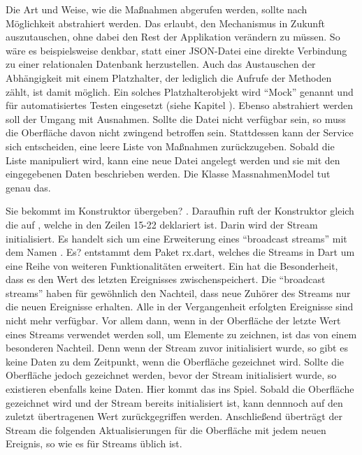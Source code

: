 Die Art und Weise, wie die Maßnahmen abgerufen werden, sollte nach Möglichkeit abstrahiert werden.
Das erlaubt, den Mechanismus in Zukunft auszutauschen, ohne dabei den Rest der Applikation verändern zu müssen.
So wäre es beispielsweise denkbar, statt einer JSON-Datei eine direkte Verbindung zu einer relationalen Datenbank herzustellen.
Auch das Austauschen der Abhängigkeit mit einem Platzhalter, der lediglich die Aufrufe der Methoden zählt, ist damit möglich.
Ein solches Platzhalterobjekt wird \enquote{Mock} genannt und für automatisiertes Testen eingesetzt (siehe Kapitel  ).
Ebenso abstrahiert werden soll der Umgang mit Ausnahmen.
Sollte die Datei nicht verfügbar sein, so muss die Oberfläche davon nicht zwingend betroffen sein.
Stattdessen kann der Service sich entscheiden, eine leere Liste von Maßnahmen zurückzugeben.
Sobald die Liste manipuliert wird, kann eine neue Datei angelegt werden und sie mit den eingegebenen Daten beschrieben werden.
Die Klasse MassnahmenModel \Lst{\ref{lst:Schritt1KlasseMassnahmenModel}} tut genau das.






Sie bekommt  im Konstruktor übergeben? .
Daraufhin ruft der Konstruktor gleich die  auf , welche in den Zeilen 15-22 deklariert ist.
Darin wird der Stream   initialisiert.
Es handelt sich um eine Erweiterung eines \enquote{broadcast streams} mit dem Namen  .
Es? entstammt dem Paket rx.dart, welches die Streams in Dart um eine Reihe von weiteren Funktionalitäten erweitert. Ein  hat die Besonderheit, dass es den Wert des letzten Ereignisses zwischenspeichert. Die \enquote{broadcast streams} haben für gewöhnlich den Nachteil, dass neue Zuhörer des Streams nur die neuen Ereignisse erhalten. Alle in der Vergangenheit erfolgten Ereignisse sind nicht mehr verfügbar. Vor allem dann, wenn in der Oberfläche der letzte Wert eines Streams verwendet werden soll, um Elemente zu zeichnen, ist das von einem besonderen Nachteil. Denn wenn der Stream zuvor initialisiert wurde, so gibt es keine Daten zu dem Zeitpunkt, wenn die Oberfläche gezeichnet wird. Sollte die Oberfläche jedoch gezeichnet werden, bevor der Stream initialisiert wurde, so  existieren ebenfalls keine Daten. Hier kommt das  ins Spiel. Sobald die Oberfläche gezeichnet wird und der Stream bereits initialisiert ist, kann dennnoch auf den zuletzt übertragenen Wert zurückgegriffen werden. Anschließend überträgt der Stream die folgenden Aktualisierungen für die Oberfläche mit jedem neuen Ereignis, so wie es für Streams üblich ist.

